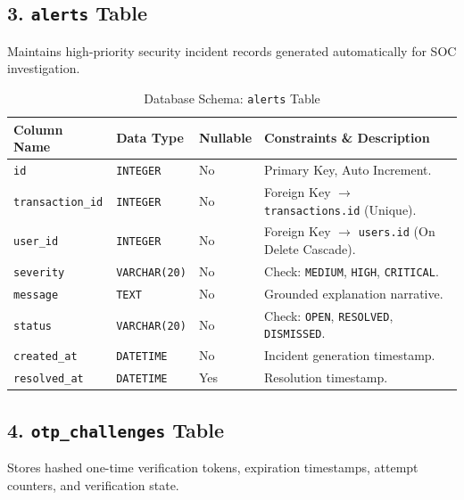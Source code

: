 \subsection{3. \texttt{alerts} Table}
Maintains high-priority security incident records generated automatically for SOC investigation.

\begin{table}[h]
\centering
\caption{Database Schema: \texttt{alerts} Table}
\label{tab:alerts_schema}
\begin{tabularx}{\textwidth}{lp{2.8cm}p{1.8cm}X}
\toprule
\textbf{Column Name} & \textbf{Data Type} & \textbf{Nullable} & \textbf{Constraints \& Description} \\
\midrule
\texttt{id} & \texttt{INTEGER} & No & Primary Key, Auto Increment. \\
\texttt{transaction\_id} & \texttt{INTEGER} & No & Foreign Key $\to$ \texttt{transactions.id} (Unique). \\
\texttt{user\_id} & \texttt{INTEGER} & No & Foreign Key $\to$ \texttt{users.id} (On Delete Cascade). \\
\texttt{severity} & \texttt{VARCHAR(20)} & No & Check: \texttt{MEDIUM}, \texttt{HIGH}, \texttt{CRITICAL}. \\
\texttt{message} & \texttt{TEXT} & No & Grounded explanation narrative. \\
\texttt{status} & \texttt{VARCHAR(20)} & No & Check: \texttt{OPEN}, \texttt{RESOLVED}, \texttt{DISMISSED}. \\
\texttt{created\_at} & \texttt{DATETIME} & No & Incident generation timestamp. \\
\texttt{resolved\_at} & \texttt{DATETIME} & Yes & Resolution timestamp. \\
\bottomrule
\end{tabularx}
\end{table}

\subsection{4. \texttt{otp\_challenges} Table}
Stores hashed one-time verification tokens, expiration timestamps, attempt counters, and verification state.

